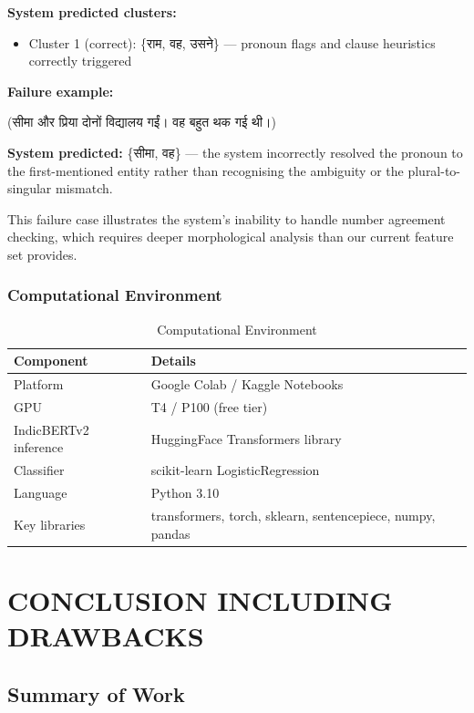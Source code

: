 \documentclass[12pt,a4paper]{report}
\begin{document}
\textbf{System predicted clusters:}
\begin{itemize}
    \item Cluster 1 (correct): \{{\hindifont राम, वह, उसने}\} --- pronoun flags and clause heuristics correctly triggered
\end{itemize}

\textbf{Failure example:}
\begin{center}
({\hindifont सीमा और प्रिया दोनों विद्यालय गईं। वह बहुत थक गई थी।})
\end{center}

\textbf{System predicted:} \{{\hindifont सीमा, वह}\} --- the system incorrectly resolved the pronoun to the first-mentioned entity rather than recognising the ambiguity or the plural-to-singular mismatch.

\noindent This failure case illustrates the system's inability to handle number agreement checking, which requires deeper morphological analysis than our current feature set provides.

\subsection{Computational Environment}

\begin{table}[H]
\centering
\caption{Computational Environment}
\begin{tabular}{|l|l|}
\hline
\textbf{Component} & \textbf{Details} \\
\hline
Platform & Google Colab / Kaggle Notebooks \\
GPU & T4 / P100 (free tier) \\
IndicBERTv2 inference & HuggingFace Transformers library \\
Classifier & scikit-learn LogisticRegression \\
Language & Python 3.10 \\
Key libraries & transformers, torch, sklearn, sentencepiece, numpy, pandas \\
\hline
\end{tabular}
\end{table}


\chapter{CONCLUSION INCLUDING DRAWBACKS}

\section{Summary of Work}
\end{document}
